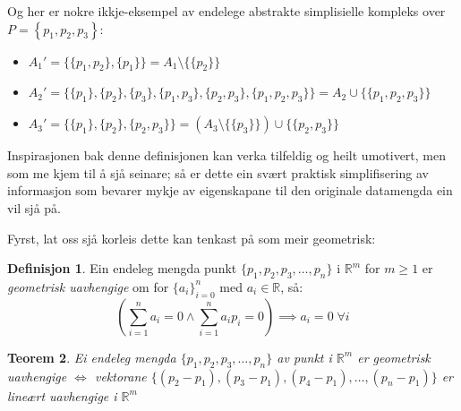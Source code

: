 \documentclass[a4paper, titlepage, 12pt, norsk]{article}
\theoremstyle{plain}
\newtheorem{theorem}{Teorem}[section]
\theoremstyle{definition}
\newtheorem{definition}[theorem]{Definisjon}
\newcommand{\Rb}{\mathbb{R}}
\newcommand{\union}{ \mathop{\cup}\limits }
\newcommand{\set}[1]{ \left \{ #1 \right \} } %
\begin{document}
Og her er nokre ikkje-eksempel av endelege abstrakte simplisielle kompleks over \( P=\set{p_1, p_2, p_3} \):

\begin{itemize}
	\item{$A_1'=\{\{p_1, p_2\}, \{p_1\}\}=A_1 \setminus \{\{p_2\}\}$}
	\item{$A_2'=\{\{p_1\}, \{p_2\}, \{p_3\}, \{p_1, p_3\}, \{p_2, p_3\}, \{p_1, p_2, p_3\}\}=A_2 \union \{\{p_1, p_2, p_3\}\}$}
	\item{$A_3'=\{\{p_1\}, \{p_2\}, \{p_2, p_3\}\}=\left(A_3 \setminus \{\{p_3\}\}\right) \union \{\{p_2, p_3\}\}$}
\end{itemize}

Inspirasjonen bak denne definisjonen kan verka tilfeldig og heilt umotivert, men som me kjem til å sjå seinare; så er dette ein svært praktisk simplifisering av informasjon som bevarer mykje av eigenskapane til den originale datamengda ein vil sjå på.

Fyrst, lat oss sjå korleis dette kan tenkast på som meir geometrisk:

\begin{definition}
	Ein endeleg mengda punkt $\{p_1, p_2, p_3, \dots, p_n\}$ i $\Rb^m$ for $m\geq1$ er \emph{geometrisk uavhengige} om for $\{a_i\}_{i=0}^n$ med $a_i\in\Rb$, så:
	\begin{equation*}
		\left(\sum_{i=1}^n a_i=0 \land  \sum_{i=1}^n a_ip_i=0\right)\implies a_i=0 \; \forall i
	\end{equation*}
\end{definition}

\begin{theorem}\label{thm:geometrisklineærtuavhengig}
	Ei endeleg mengda $\{p_1, p_2, p_3, \dots, p_n \}$ av punkt i $\Rb^m$ er geometrisk uavhengige $\Longleftrightarrow$ vektorane $\{(p_2-p_1), (p_3-p_1), (p_4-p_1),\dots,(p_n-p_1)\}$ er lineært uavhengige i $\Rb^m$
\end{theorem}
\end{document}
